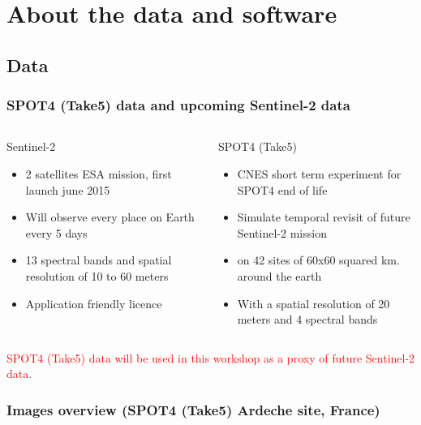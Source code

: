\documentclass[8pt]{beamer}
\begin{document}
\section{About the data and software}
\subsection{Data}
\begin{frame}

\frametitle{SPOT4 (Take5) data and upcoming Sentinel-2 data}

\begin{columns}[t]
\begin{column}{5cm}
\begin{block}{Sentinel-2}
\begin{itemize}
\item 2 satellites ESA mission, first launch june 2015
\item Will observe every place on Earth every 5 days
\item 13 spectral bands and spatial resolution of 10 to 60 meters
\item Application friendly licence
\end{itemize}
\end{block}
\end{column}
\begin{column}{5cm}
\begin{block}{SPOT4 (Take5)}
\begin{itemize}
\item CNES short term experiment for SPOT4 end of life
\item Simulate temporal revisit of future Sentinel-2 mission
\item on 42 sites of 60x60 squared km. around the earth
\item With a spatial resolution of 20 meters and 4 spectral bands
\end{itemize}
\end{block}
\end{column}
\end{columns}

\textcolor{red}{SPOT4 (Take5) data will be used in this workshop as a proxy of future Sentinel-2 data.}

\end{frame}



\begin{frame}
\frametitle{Images overview (SPOT4 (Take5) Ardeche site, France)}

\end{frame}
\end{document}
